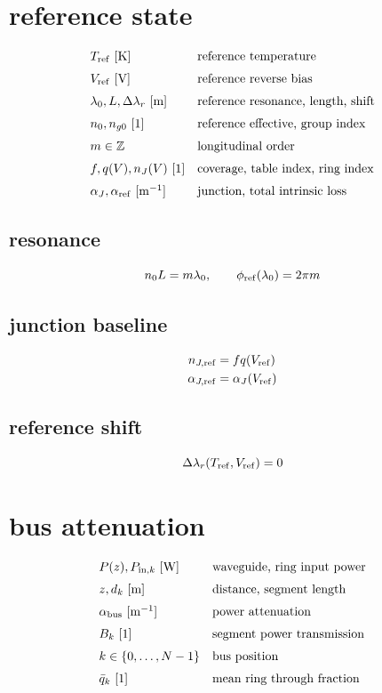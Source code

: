 \documentclass[11pt]{article}
\begin{document}
\section*{reference state}
\[
\begin{array}{ll}T_{\rm ref}\ [\mathrm K]&\text{reference temperature}\\[0.6em]V_{\rm ref}\ [\mathrm V]&\text{reference reverse bias}\\[0.6em]\lambda_0,L,\Delta\lambda_r\ [\mathrm m]&\text{reference resonance, length, shift}\\[0.6em]n_0,n_{g0}\ [1]&\text{reference effective, group index}\\[0.6em]m\in\mathbb Z&\text{longitudinal order}\\[0.6em]f,q(V),n_J(V)\ [1]&\text{coverage, table index, ring index}\\[0.6em]\alpha_J,\alpha_{\rm ref}\ [\mathrm{m^{-1}}]&\text{junction, total intrinsic loss}\end{array}
\]
\subsection*{resonance}
\[
\displaystyle n_0L=m\lambda_0,\qquad\phi_{\rm ref}(\lambda_0)=2\pi m
\]
\subsection*{junction baseline}
\[
\displaystyle \begin{aligned}n_{J,\rm ref}&=f q(V_{\rm ref})\\\alpha_{J,\rm ref}&=\alpha_J(V_{\rm ref})\end{aligned}
\]
\subsection*{reference shift}
\[
\displaystyle \Delta\lambda_r(T_{\rm ref},V_{\rm ref})=0
\]

\clearpage
\section*{bus attenuation}
\[
\begin{array}{ll}P(z),P_{{\rm in},k}\ [\mathrm W]&\text{waveguide, ring input power}\\[0.6em]z,d_k\ [\mathrm m]&\text{distance, segment length}\\[0.6em]\alpha_{\rm bus}\ [\mathrm{m^{-1}}]&\text{power attenuation}\\[0.6em]B_k\ [1]&\text{segment power transmission}\\[0.6em]k\in\{0,\ldots,N-1\}&\text{bus position}\\[0.6em]\bar q_k\ [1]&\text{mean ring through fraction}\end{array}
\]
\end{document}
